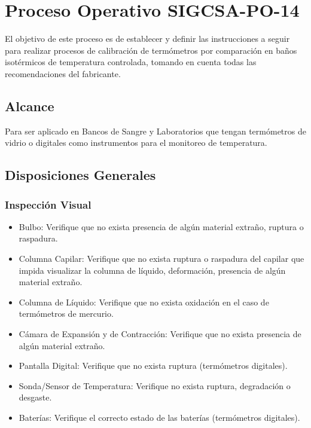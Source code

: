 \section{Proceso Operativo SIGCSA-PO-14}
\par 

	El objetivo de este proceso es de establecer y definir las instrucciones a seguir para realizar procesos de calibración de termómetros
	por comparación en baños isotérmicos de temperatura controlada, tomando en cuenta todas las
	recomendaciones del fabricante.
	
\subsection{Alcance}
\par 
	Para ser aplicado en Bancos de Sangre y Laboratorios que tengan termómetros de vidrio o digitales
	como instrumentos para el monitoreo de temperatura.
	
\subsection{Disposiciones Generales}
\subsubsection{Inspección Visual}

\begin{itemize}
	\item Bulbo: Verifique que no exista presencia de algún material extraño, ruptura o
	raspadura.
	
	\item Columna Capilar: Verifique que no exista ruptura o raspadura del capilar que
	impida visualizar la columna de líquido, deformación, presencia de algún material
	extraño.
	
	\item Columna de Líquido: Verifique que no exista oxidación en el caso de termómetros
	de mercurio.
	
	\item Cámara de Expansión y de Contracción: Verifique que no exista presencia de algún
	material extraño.
	
	\item Pantalla Digital: Verifique que no exista ruptura (termómetros digitales).
	
	\item Sonda/Sensor de Temperatura: Verifique no exista ruptura, degradación o
	desgaste.
	
	\item Baterías: Verifique el correcto estado de las baterías (termómetros digitales).
\end{itemize}
		
